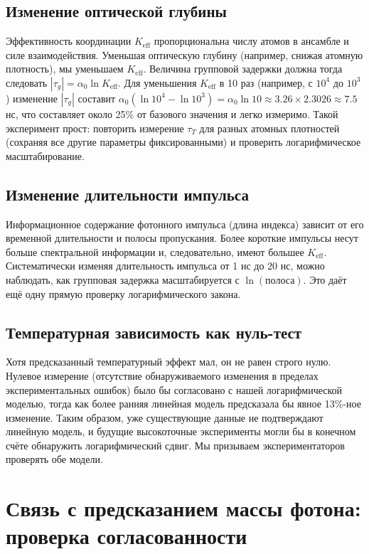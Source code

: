 \documentclass[12pt,a4paper]{article}
\newcommand{\Keff}{K_{\mathrm{eff}}}
\begin{document}
	\subsection{Изменение оптической глубины}
	
	Эффективность координации \(\Keff\) пропорциональна числу атомов в ансамбле и силе взаимодействия. Уменьшая оптическую глубину (например, снижая атомную плотность), мы уменьшаем \(\Keff\). Величина групповой задержки должна тогда следовать \(|\tau_g| = \alpha_0 \ln\Keff\). Для уменьшения \(\Keff\) в 10 раз (например, с \(10^4\) до \(10^3\)) изменение \(|\tau_g|\) составит \(\alpha_0 (\ln 10^4 - \ln 10^3) = \alpha_0 \ln 10 \approx 3.26 \times 2.3026 \approx 7.5\) нс, что составляет около 25\% от базового значения и легко измеримо. Такой эксперимент прост: повторить измерение \(\tau_T\) для разных атомных плотностей (сохраняя все другие параметры фиксированными) и проверить логарифмическое масштабирование.
	
	\subsection{Изменение длительности импульса}
	
	Информационное содержание фотонного импульса (длина индекса) зависит от его временной длительности и полосы пропускания. Более короткие импульсы несут больше спектральной информации и, следовательно, имеют большее \(\Keff\). Систематически изменяя длительность импульса от 1 нс до 20 нс, можно наблюдать, как групповая задержка масштабируется с \(\ln(\text{полоса})\). Это даёт ещё одну прямую проверку логарифмического закона.
	
	\subsection{Температурная зависимость как нуль-тест}
	
	Хотя предсказанный температурный эффект мал, он не равен строго нулю. Нулевое измерение (отсутствие обнаруживаемого изменения в пределах экспериментальных ошибок) было бы согласовано с нашей логарифмической моделью, тогда как более ранняя линейная модель предсказала бы явное 13\%-ное изменение. Таким образом, уже существующие данные не подтверждают линейную модель, и будущие высокоточные эксперименты могли бы в конечном счёте обнаружить логарифмический сдвиг. Мы призываем экспериментаторов проверять обе модели.
	
	\section{Связь с предсказанием массы фотона: проверка согласованности}
	\label{sec:photon_mass_consistency}
	
\end{document}
